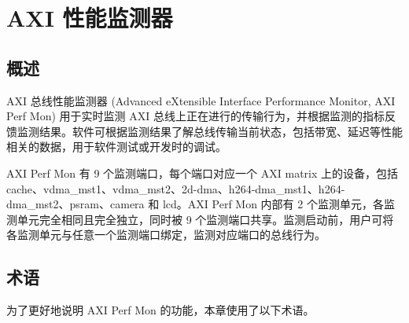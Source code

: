 \documentclass[main\_\_CN.tex]{subfiles}
\begin{document}
\setchineseformatting


\ifglobal
\else
    \clearpage
    \listoftodos
    \listofdonetodos
    \tableofcontents
\fi



\hypertarget{aximon}{}
\chapter{AXI 性能监测器}
\label{mod:aximon}


\section{概述}
\label{sec:aximon-overview}

AXI 总线性能监测器 (Advanced eXtensible Interface Performance Monitor, AXI Perf Mon) 用于实时监测 AXI 总线上正在进行的传输行为，并根据监测的指标反馈监测结果。软件可根据监测结果了解总线传输当前状态，包括带宽、延迟等性能相关的数据，用于软件测试或开发时的调试。

AXI Perf Mon 有 9 个监测端口，每个端口对应一个 AXI matrix 上的设备，包括 cache、vdma\_mst1、vdma\_mst2、2d-dma、h264-dma\_mst1、h264-dma\_mst2、psram、camera 和 lcd。AXI Perf Mon 内部有 2 个监测单元，各监测单元完全相同且完全独立，同时被 9 个监测端口共享。监测启动前，用户可将各监测单元与任意一个监测端口绑定，监测对应端口的总线行为。




\section{术语}
\label{sec:aximon-term}

为了更好地说明 AXI Perf Mon 的功能，本章使用了以下术语。
\end{document}
